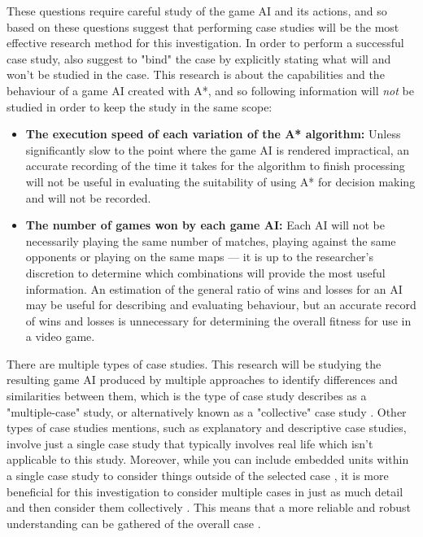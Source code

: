 \documentclass[11pt, a4paper]{article}
\begin{document}
These questions require careful study of the game AI and its actions, and so based on these questions \citeauthor{baxter2008qualitative} \parencite*[545]{baxter2008qualitative} suggest that performing case studies will be the most effective research method for this investigation. In order to perform a successful case study, \citeauthor{baxter2008qualitative} \parencite*[546]{baxter2008qualitative} also suggest to "bind" the case by explicitly stating what will and won't be studied in the case. This research is about the capabilities and the behaviour of a game AI created with A*, and so following information will \emph{not} be studied in order to keep the study in the same scope:

\begin{itemize}
\item \textbf{The execution speed of each variation of the A* algorithm:} Unless significantly slow to the point where the game AI is rendered impractical, an accurate recording of the time it takes for the algorithm to finish processing will not be useful in evaluating the suitability of using A* for decision making and will not be recorded.
\item \textbf{The number of games won by each game AI:} Each AI will not be necessarily playing the same number of matches, playing against the same opponents or playing on the same maps --- it is up to the researcher's discretion to determine which combinations will provide the most useful information. An estimation of the general ratio of wins and losses for an AI may be useful for describing and evaluating behaviour, but an accurate record of wins and losses is unnecessary for determining the overall fitness for use in a video game.
\end{itemize}

There are multiple types of case studies. This research will be studying the resulting game AI produced by multiple approaches to identify differences and similarities between them, which is the type of case study \citeauthor{yin2003k} \parencite*{yin2003k} describes as a "multiple-case" study, or alternatively known as a "collective" case study \parencite{stake1995art}. Other types of case studies \citeauthor{yin2003k} \parencite*{yin2003k} mentions, such as explanatory and descriptive case studies, involve just a single case study that typically involves real life which isn't applicable to this study. Moreover, while you can include embedded units within a single case study to consider things outside of the selected case \parencite[550]{baxter2008qualitative}, it is more beneficial for this investigation to consider multiple cases in just as much detail and then consider them collectively \parencite[555]{baxter2008qualitative}. This means that a more reliable and robust understanding can be gathered of the overall case \parencite[550]{baxter2008qualitative}.
\end{document}
